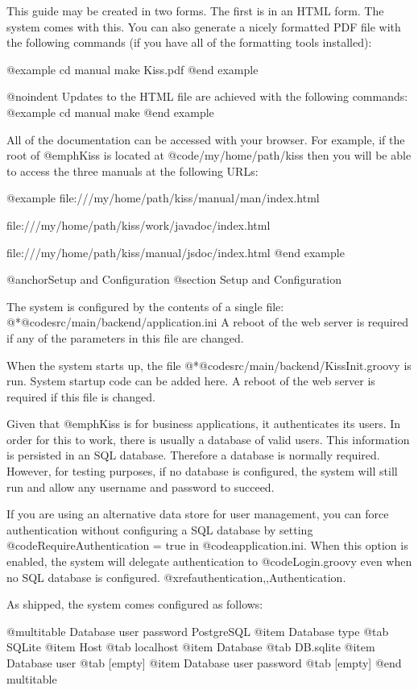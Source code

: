 This guide may be created in two forms.  The first is in an HTML
form.  The system comes with this.  You can also generate a nicely
formatted PDF file with the following commands (if you have all of the
formatting tools installed):

@example
cd manual
make Kiss.pdf
@end example

@noindent
Updates to the HTML file are achieved with the following commands:
@example
cd manual
make
@end example

All of the documentation can be accessed with your browser.  For
example, if the root of @emph{Kiss} is located at
@code{/my/home/path/kiss} then you will be able to access the three
manuals at the following URLs:

@example
file:///my/home/path/kiss/manual/man/index.html

file:///my/home/path/kiss/work/javadoc/index.html

file:///my/home/path/kiss/manual/jsdoc/index.html
@end example

@anchor{Setup and Configuration}
@section Setup and Configuration

The system is configured by the contents of a single file:
@*@code{src/main/backend/application.ini} A reboot of the web server
is required if any of the parameters in this file are changed.

When the system starts up, the file
@*@code{src/main/backend/KissInit.groovy} is run.  System startup code can be added here.
A reboot of the web server
is required if this file is changed.

Given that @emph{Kiss} is for business applications, it authenticates its
users.  In order for this to work, there is usually a database of valid
users.  This information is persisted in an SQL database.  Therefore a
database is normally required.  However, for testing purposes, if no
database is configured, the system will still run and allow any
username and password to succeed.

If you are using an alternative data store for user management, you
can force authentication without configuring a SQL database by setting
@code{RequireAuthentication = true} in @code{application.ini}.  When
this option is enabled, the system will delegate authentication to
@code{Login.groovy} even when no SQL database is configured.
@xref{authentication,,Authentication}.

As shipped, the system comes configured as follows:

@multitable {Database user password} {PostgreSQL} 
@item Database type
@tab SQLite
@item Host
@tab localhost
@item Database
@tab DB.sqlite
@item Database user
@tab [empty]
@item Database user password
@tab [empty]
@end multitable

